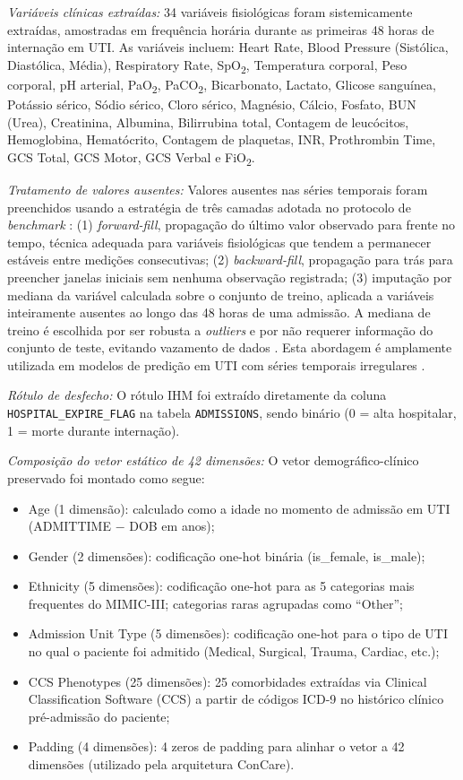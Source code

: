\textit{Variáveis clínicas extraídas:} 34 variáveis fisiológicas foram sistemicamente extraídas, amostradas em frequência horária durante as primeiras 48 horas de internação em UTI. As variáveis incluem: Heart Rate, Blood Pressure (Sistólica, Diastólica, Média), Respiratory Rate, SpO\textsubscript{2}, Temperatura corporal, Peso corporal, pH arterial, PaO\textsubscript{2}, PaCO\textsubscript{2}, Bicarbonato, Lactato, Glicose sanguínea, Potássio sérico, Sódio sérico, Cloro sérico, Magnésio, Cálcio, Fosfato, BUN (Urea), Creatinina, Albumina, Bilirrubina total, Contagem de leucócitos, Hemoglobina, Hematócrito, Contagem de plaquetas, INR, Prothrombin Time, GCS Total, GCS Motor, GCS Verbal e FiO\textsubscript{2}.

\textit{Tratamento de valores ausentes:} Valores ausentes nas séries temporais foram preenchidos usando a estratégia de três camadas adotada no protocolo de \textit{benchmark} \cite{Harutyunyan2019}: (1) \textit{forward-fill}, propagação do último valor observado para frente no tempo, técnica adequada para variáveis fisiológicas que tendem a permanecer estáveis entre medições consecutivas; (2) \textit{backward-fill}, propagação para trás para preencher janelas iniciais sem nenhuma observação registrada; (3) imputação por mediana da variável calculada sobre o conjunto de treino, aplicada a variáveis inteiramente ausentes ao longo das 48 horas de uma admissão. A mediana de treino é escolhida por ser robusta a \textit{outliers} e por não requerer informação do conjunto de teste, evitando vazamento de dados \cite{Che2018}. Esta abordagem é amplamente utilizada em modelos de predição em UTI com séries temporais irregulares \cite{Harutyunyan2019, Che2018}.

\textit{Rótulo de desfecho:} O rótulo IHM foi extraído diretamente da coluna \texttt{HOSPITAL\_EXPIRE\_FLAG} na tabela \texttt{ADMISSIONS}, sendo binário (0 = alta hospitalar, 1 = morte durante internação).

\textit{Composição do vetor estático de 42 dimensões:} O vetor demográfico-clínico preservado foi montado como segue:
\begin{itemize}
    \item Age (1 dimensão): calculado como a idade no momento de admissão em UTI (ADMITTIME $-$ DOB em anos);
    \item Gender (2 dimensões): codificação one-hot binária (is\_female, is\_male);
    \item Ethnicity (5 dimensões): codificação one-hot para as 5 categorias mais frequentes do MIMIC-III; categorias raras agrupadas como ``Other'';
    \item Admission Unit Type (5 dimensões): codificação one-hot para o tipo de UTI no qual o paciente foi admitido (Medical, Surgical, Trauma, Cardiac, etc.);
    \item CCS Phenotypes (25 dimensões): 25 comorbidades extraídas via Clinical Classification Software (CCS) a partir de códigos ICD-9 no histórico clínico pré-admissão do paciente;
    \item Padding (4 dimensões): 4 zeros de padding para alinhar o vetor a 42 dimensões (utilizado pela arquitetura ConCare).
\end{itemize}

